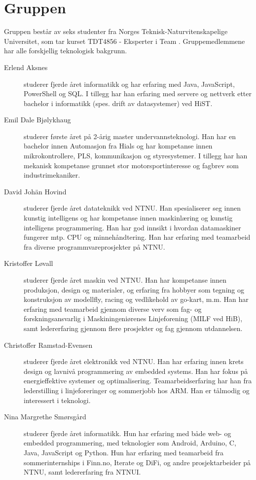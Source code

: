 \section{Gruppen}
Gruppen består av seks studenter fra Norges Teknisk-Naturvitenskapelige
Universitet, som tar kurset TDT4856 - Eksperter i Team \cite{tdt4856}. Gruppemedlemmene
har alle forskjellig teknologisk bakgrunn.
\begin{description} 
	\item[Erlend Aksnes] studerer fjerde året informatikk og har erfaring med Java, 
		JavaScript, PowerShell og SQL. I tillegg har han erfaring med servere og nettverk 
		etter bachelor i informatikk (spes. drift av datasystemer) ved HiST. 
	\item[Emil Dale Bjølykhaug] studerer første året på 2-årig master undervannsteknologi. 
		Han har en bachelor innen Automasjon fra Hials og har kompetanse innen mikrokontrollere, PLS, 
		kommunikasjon og styresystemer. I tillegg har han mekanisk kompetanse grunnet stor 
		motorsportinteresse og fagbrev som industrimekaniker.
	\item[David Johän Hovind] studerer fjerde året datateknikk ved NTNU. 
		Han spesialiserer seg innen kunstig intelligens og har kompetanse innen maskinlæring
		og kunstig intelligens programmering. Han har god innsikt i hvordan datamaskiner fungerer
		mtp. CPU og minnehåndtering. Han har erfaring med teamarbeid fra diverse 
		programmvareprosjekter på NTNU.
	\item[Kristoffer Løvall] studerer fjerde året maskin ved NTNU. 
		Han har kompetanse innen produksjon, design og materialer, og erfaring
		fra hobbyer som tegning og konstruksjon av modellfly, racing og vedlikehold
		av go-kart, m.m. Han har erfaring med teamarbeid gjennom diverse verv som fag-
		og forskningsansvarlig i Maskiningeniørenes Linjeforening (MILF ved HiB), samt
		ledererfaring gjennom flere prosjekter og fag gjennom utdannelsen.
	\item[Christoffer Ramstad-Evensen] studerer fjerde
		året elektronikk ved NTNU. Han har erfaring innen krets design
		og lavnivå programmering av embedded systems. Han har fokus på energieffektive
		systemer og optimalisering. Teamarbeidserfaring har han fra lederstilling i
		linjeforeringer og sommerjobb hos ARM. Han er tålmodig og interessert i
		teknologi.
	\item[Nina Margrethe Smørsgård] studerer fjerde året
		informatikk. Hun har erfaring med både web- og embedded programmering, med
		teknologier som Android, Arduino, C, Java, JavaScript og Python. Hun har
		erfaring med teamarbeid fra sommerinternships i Finn.no, Iterate og DiFi,
		og andre prosjektarbeider på NTNU, samt ledererfaring fra NTNUI.
\end{description}